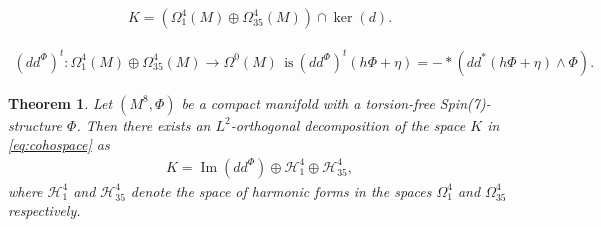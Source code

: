 \documentclass[10pt,a4paper]{amsart}
\newtheorem{theorem}{Theorem}
\DeclareMathOperator{\Ima}{Im}
\def\cH{\mathcal{H}}
\def\ddphi{dd^{\Phi}}
\begin{document}
\begin{align}\label{eq:cohospace}
K= \left(\Omega^4_1(M)\oplus \Omega^4_{35}(M) \right)\cap \ker(d).
\end{align}

\begin{align}\label{ddphiadjoint}
(\ddphi)^t: \Omega^4_1(M)\oplus \Omega^4_{35}(M)\rightarrow \Omega^0(M)\ \ \text{is}\ (\ddphi)^t(h\Phi+\eta) = -*(dd^*(h\Phi+\eta)\wedge \Phi).
\end{align}

\begin{theorem}\label{thm:Spin7Hodge}
Let $(M^8, \Phi)$ be a compact manifold with a torsion-free Spin(7)-structure $\Phi$. Then there exists an $L^2$-orthogonal decomposition of the space $K$ in \cref{eq:cohospace} as
\begin{align}\label{eq:Spin7Hodge}
K=\Ima(\ddphi) \oplus \cH^4_1\oplus \cH^4_{35},
\end{align}
where $\cH^4_1$ and $\cH^4_{35}$ denote the space of harmonic forms in the spaces $\Omega^4_1$ and $\Omega^4_{35}$ respectively.
\end{theorem}
\end{document}

